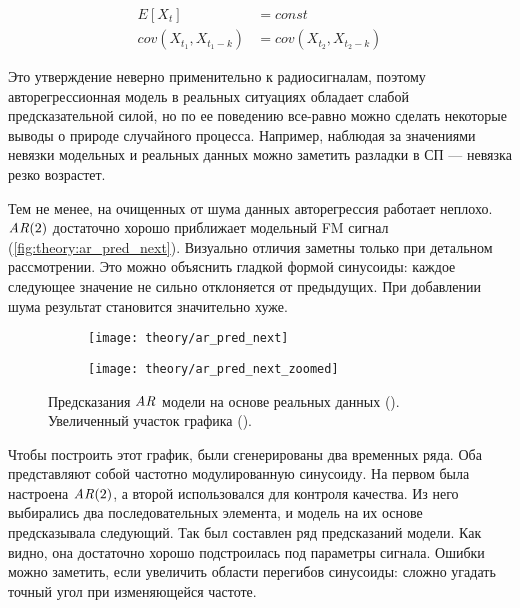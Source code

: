 \begin{equation}
  \begin{split}
    E[X_t] & = const \\
    cov(X_{t_1}, X_{t_1-k}) & = cov(X_{t_2}, X_{t_2-k})
  \end{split}
\end{equation}

Это утверждение неверно применительно к радиосигналам, поэтому авторегрессионная модель в реальных ситуациях обладает слабой предсказательной силой, но по ее поведению все-равно можно сделать некоторые выводы о природе случайного процесса. Например, наблюдая за значениями невязки модельных и реальных данных можно заметить разладки в СП --- невязка резко возрастет.

Тем не менее, на очищенных от шума данных авторегрессия работает неплохо. $\mathit{AR}(2)$ достаточно хорошо приближает модельный FM сигнал (\autoref{fig:theory:ar_pred_next}). Визуально отличия заметны только при детальном рассмотрении. Это можно объяснить гладкой формой синусоиды: каждое следующее значение не сильно отклоняется от предыдущих. При добавлении шума результат становится значительно хуже.

\begin{figure}[h]
  \centering
  \begin{subfigure}{0.45\textwidth}
    \texttt{[image: theory/ar\_pred\_next]}
    \caption{}
    \label{fig:theory:ar_pred_next_whole}
  \end{subfigure}
  \begin{subfigure}{0.45\textwidth}
    \texttt{[image: theory/ar\_pred\_next\_zoomed]}
    \caption{}
    \label{fig:theory:ar_pred_next_zoomed}
  \end{subfigure}
  \caption{Предсказания $\mathit{AR}$ модели на основе реальных данных (). Увеличенный участок графика ().}
  \label{fig:theory:ar_pred_next}
\end{figure}

Чтобы построить этот график, были сгенерированы два временных ряда. Оба представляют собой частотно модулированную синусоиду. На первом была настроена $\mathit{AR}(2)$, а второй использовался для контроля качества. Из него выбирались два последовательных элемента, и модель на их основе предсказывала следующий. Так был составлен ряд предсказаний модели. Как видно, она достаточно хорошо подстроилась под параметры сигнала. Ошибки можно заметить, если увеличить области перегибов синусоиды: сложно угадать точный угол при изменяющейся частоте.

